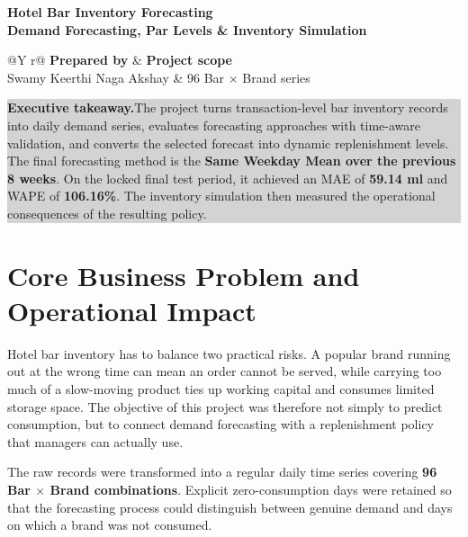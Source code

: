 \documentclass[11pt,a4paper]{article}
\begin{document}
\begin{flushleft}
{\color{navy}\fontsize{21}{24}\selectfont\bfseries Hotel Bar Inventory Forecasting\\[2pt]
\color{teal}\fontsize{13}{16}\selectfont Demand Forecasting, Par Levels \& Inventory Simulation}
\end{flushleft}

\vspace{3pt}
\noindent{\color{rulegray}\rule{\textwidth}{0.8pt}}
\vspace{5pt}

\noindent
\begin{tabularx}{\textwidth}{@{}Y r@{}}
\textbf{Prepared by} & \textbf{Project scope}\\
Swamy Keerthi Naga Akshay & 96 Bar $\times$ Brand series\\
\end{tabularx}

\vspace{6pt}

\noindent\colorbox{lightgray}{%
\begin{minipage}{0.965\textwidth}
\small\textbf{Executive takeaway.}\quad The project turns transaction-level bar inventory records into daily demand series, evaluates forecasting approaches with time-aware validation, and converts the selected forecast into dynamic replenishment levels. The final forecasting method is the \textbf{Same Weekday Mean over the previous 8 weeks}. On the locked final test period, it achieved an MAE of \textbf{59.14 ml} and WAPE of \textbf{106.16\%}. The inventory simulation then measured the operational consequences of the resulting policy.
\end{minipage}}

\section{Core Business Problem and Operational Impact}

Hotel bar inventory has to balance two practical risks. A popular brand running out at the wrong time can mean an order cannot be served, while carrying too much of a slow-moving product ties up working capital and consumes limited storage space. The objective of this project was therefore not simply to predict consumption, but to connect demand forecasting with a replenishment policy that managers can actually use.

The raw records were transformed into a regular daily time series covering \textbf{96 Bar $\times$ Brand combinations}. Explicit zero-consumption days were retained so that the forecasting process could distinguish between genuine demand and days on which a brand was not consumed.
\end{document}
